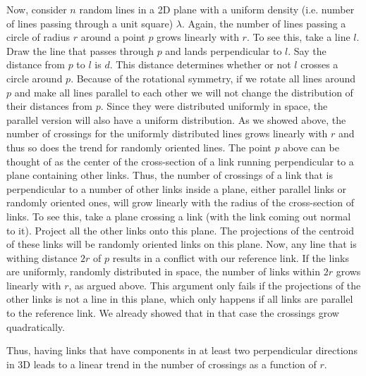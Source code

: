 \documentclass[linenumbers,endfloats,nofootinbib,preprint,floatfix,titlepage,superscriptaddress]{revtex4-1} %
\begin{document}
Now, consider $n$ random lines in a 2D plane with a uniform density (i.e. number of lines passing through a unit square) $\lambda$. Again, the number of lines passing a circle of radius $r$ around a point $p$ grows linearly with $r$. To see this, take a line $l$. Draw the line that passes through $p$ and lands perpendicular to $l$. Say the distance from $p$ to $l$ is $d$. 
This distance determines whether or not $l$ crosses a circle around $p$. Because of the rotational symmetry, if we rotate all lines around $p$ and make all lines parallel to each other we will not change the distribution of their distances from $p$. Since they were distributed uniformly in space, the parallel version will also have a uniform distribution. As we showed above, the number of crossings for the uniformly distributed lines grows linearly with $r$ and thus so does the trend for randomly oriented lines. 
The point $p$ above can be thought of as the center of the cross-section of a link running perpendicular to a plane containing other links. 
Thus, the number of crossings of a link that is perpendicular to a number of other links inside a plane, either parallel links or randomly oriented ones, will grow linearly with the radius of the cross-section of links. 
To see this, take a plane crossing a link (with the link coming out normal to it). 
Project all the other links onto this plane. 
The projections of the centroid of these links will be randomly oriented links on this plane. 
Now, any line that is withing distance $2r$ of $p$ results in a conflict with our reference link. 
If the links are uniformly, randomly distributed in space, the number of links within $2r$ grows linearly with $r$, as argued above. 
This argument only fails if the projections of the other links is not a line in this plane, which only happens if all links are parallel to the reference link. 
We already showed that in that case the crossings grow quadratically. 


Thus, having links that have components in at least two perpendicular directions in 3D leads to a linear trend in the number of crossings as a function of $r$.  
\end{document}
